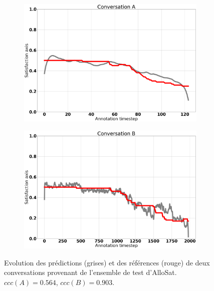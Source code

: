 \begin{figure}[h]
        \centering
        \begin{subfigure}{.49\textwidth}
          \centering
          \includegraphics[width=.99\linewidth]{./Chapitre5/figures/cccVSrmse1.png}
        \end{subfigure}
        \begin{subfigure}{.49\textwidth}
          \centering
          \includegraphics[width=.99\linewidth]{./Chapitre5/figures/cccVSrmse2.png}
        \end{subfigure}
        \caption{Evolution des prédictions (grises) et des références (rouge) de deux conversations provenant de l'ensemble de test d'AlloSat. $ccc(A) = 0.564$, $ccc(B) = 0.903$.}
        \label{fig:cccVSrmse}
    \end{figure}
